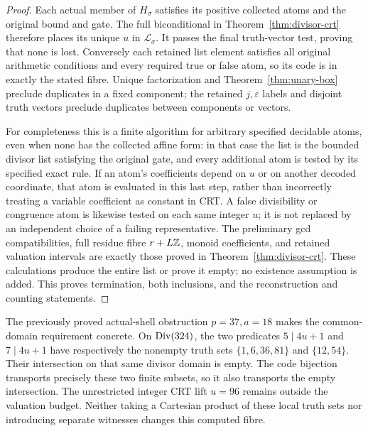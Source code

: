 \begin{proof}
Each actual member of \(H_\sigma\) satisfies its positive
collected atoms and the original bound and gate.  The full
biconditional in Theorem~\ref{thm:divisor-crt} therefore places
its unique \(u\) in \(\mathcal L_\sigma\).
It passes the final truth-vector test, proving that none is lost.
Conversely each retained list element satisfies all original
arithmetic conditions and every required true or false atom,
so its code is in exactly the stated fibre.
Unique factorization and Theorem~\ref{thm:unary-box} preclude
duplicates in a fixed component; the retained \(j,\varepsilon\)
labels and disjoint truth vectors preclude duplicates between
components or vectors.

For completeness this is a finite algorithm for arbitrary
specified decidable atoms, even when none has the collected
affine form: in that case the list is the bounded divisor
list satisfying the original gate, and every additional atom
is tested by its specified exact rule.  If an atom's coefficients
depend on \(u\) or on another decoded coordinate, that atom is
evaluated in this last step, rather than incorrectly treating
a variable coefficient as constant in CRT.
A false divisibility or congruence atom is likewise tested
on each same integer \(u\); it is not replaced by an independent
choice of a failing representative.  The preliminary gcd
compatibilities, full residue fibre \(r+L\mathbb Z\), monoid
coefficients, and retained valuation intervals are exactly
those proved in Theorem~\ref{thm:divisor-crt}.
These calculations produce the entire list or prove it empty;
no existence assumption is added.  This proves termination,
both inclusions, and the reconstruction and counting statements.
\end{proof}

The previously proved actual-shell obstruction \(p=37,a=18\)
makes the common-domain requirement concrete.  On
\(\operatorname{Div}(324)\), the two predicates \(5\mid4u+1\) and
\(7\mid4u+1\) have respectively the nonempty truth sets
\(\{1,6,36,81\}\) and \(\{12,54\}\).
Their intersection on that same divisor domain is empty.
The code bijection transports precisely these two finite
subsets, so it also transports the empty intersection.
The unrestricted integer CRT lift \(u=96\) remains outside
the valuation budget.  Neither taking a Cartesian product
of these local truth sets nor introducing separate
witnesses changes this computed fibre.

